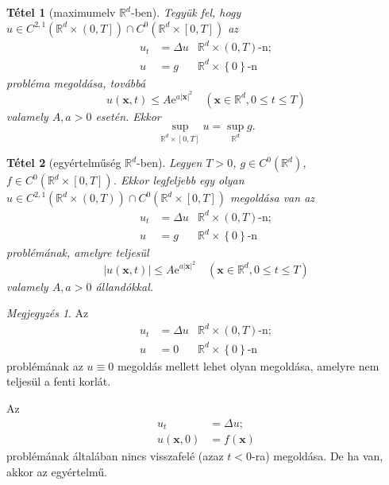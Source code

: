 \documentclass[DIV=15,appendixprefix]{scrreprt}
\newtheorem*{tetel}{Tétel}
\theoremstyle{definition}
\theoremstyle{remark}
\newtheorem*{megj}{Megjegyzés}
\begin{document}
\begin{tetel}[maximumelv $ \mathbb{ R }^{ d } $-ben]
	Tegyük fel, hogy $ u \in C^{ 2,{} 1 } \left( \mathbb{ R }^{ d } \times \left.\left( 0,{} T \right]\right. \right) \cap C^{ 0 } \left( \mathbb{ R }^{ d } \times \left[ 0,{} T \right] \right) $ az
	\begin{align*}
		u_{ t } &= \Delta u & \mathbb{ R }^{ d } \times \left( 0,{} T \right) \text{-n};\\
		u &= g & \mathbb{ R }^{ d } \times \left\{ 0 \right\} \text{-n}
	\end{align*}
	probléma megoldása, továbbá
	\begin{equation*}
		u \left( \mathbf{ x },{} t \right) \le A \mathrm{ e }^{ a \left| \mathbf{ x }
		\right|^{ 2 } } \quad \left( \mathbf{ x } \in \mathbb{ R }^{ d },{} 0 \le t \le T \right)
	\end{equation*}
	valamely $ A,{} a > 0 $ esetén. Ekkor
	\begin{equation*}
		\sup_{ \mathbb{ R }^{ d } \times \left[ 0,{} T \right] } u = \sup_{ \mathbb{ R }^{ d } } g.
	\end{equation*}
\end{tetel}
\begin{tetel}[egyértelműség $\mathbb{R}^{d}$-ben]
Legyen $ T > 0$, $ g \in C^{ 0 } \left( \mathbb{ R }^{ d } \right) $, $ f \in C^{ 0 } \left(
\mathbb{ R }^{ d } \times \left[ 0,{} T \right] \right) $. Ekkor legfeljebb egy olyan $ u \in
C^{ 2,{} 1 } \left( \mathbb{ R }^{ d } \times \left( 0,{} T \right) \right) \cap C^{ 0 } \left(
\mathbb{ R }^{ d } \times \left[ 0,{} T \right] \right)$ megoldása van az
\begin{align*}
	u_{ t } &= \Delta u & \mathbb{ R }^{ d } \times \left( 0,{} T \right) \text{-n};\\
	u &= g & \mathbb{ R }^{ d } \times \left\{ 0 \right\} \text{-n}
\end{align*}
problémának, amelyre teljesül
\begin{equation*}
	\left| u \left( \mathbf{ x },{} t \right) \right| \le A \mathrm{ e }^{ a \left| \mathbf{ x } \right|^{ 2 } } \quad \left( \mathbf{ x } \in \mathbb{ R }^{ d },{} 0 \le t \le T \right)
\end{equation*}
valamely $ A,{} a > 0 $ állandókkal.
\end{tetel}
\begin{megj}
	Az
	\begin{align*}
		u_{ t } &= \Delta u & \mathbb{ R }^{ d } \times \left( 0,{} T \right) \text{-n};\\
		u &= 0 & \mathbb{ R }^{ d } \times \left\{ 0 \right\} \text{-n}
	\end{align*}
	problémának az $ u \equiv 0 $ megoldás mellett lehet olyan megoldása, amelyre nem teljesül a fenti korlát.
\end{megj}
Az
\begin{align*}
	u_{ t } &= \Delta u;\\
	u \left( \mathbf{ x },{} 0 \right) &= f \left( \mathbf{ x } \right)
\end{align*}
problémának általában nincs visszafelé (azaz $ t < 0 $-ra) megoldása. De ha van, akkor az
egyértelmű.
%
\end{document}
